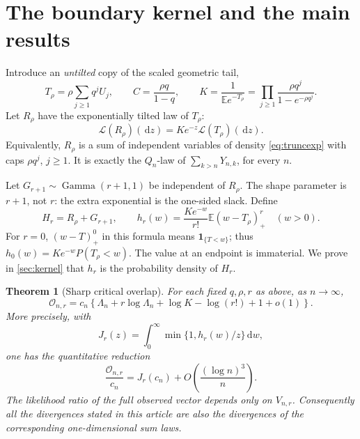 \documentclass[11pt,oneside]{article}
\numberwithin{equation}{section}
\theoremstyle{plain}
\newtheorem{theorem}{Theorem}[section]
\theoremstyle{definition}
\theoremstyle{remark}
\newcommand{\E}{\mathbb E}
\newcommand{\ind}{\mathbf 1}
\newcommand{\Law}{\mathcal L}
\newcommand{\OO}{\mathcal O}
\newcommand{\dd}{\,\mathrm d}
\newcommand{\Gam}{\operatorname{Gamma}}
\begin{document}
\section{The boundary kernel and the main results}
\label{sec:main}
Introduce an \emph{untilted} copy of the scaled geometric tail,
\begin{equation}\label{eq:T}
 T_\rho=\rho\sum_{j\ge1}q^jU_j,\qquad
 C=\frac{\rho q}{1-q},\qquad
 K=\frac1{\E e^{-T_\rho}}
   =\prod_{j\ge1}\frac{\rho q^j}{1-e^{-\rho q^j}}.
\end{equation}
Let $R_\rho$ have the exponentially tilted law of $T_\rho$:
\begin{equation}\label{eq:R}
 \Law(R_\rho)(\dd z)=K e^{-z}\Law(T_\rho)(\dd z).
\end{equation}
Equivalently, $R_\rho$ is a sum of independent variables of density
\eqref{eq:truncexp} with caps $\rho q^j$, $j\ge1$. It is exactly the
$Q_n$-law of $\sum_{k>n}Y_{n,k}$, for every $n$.

Let $G_{r+1}\sim\Gam(r+1,1)$ be independent of $R_\rho$. The
shape parameter is $r+1$, not $r$: the extra exponential is the
one-sided slack. Define
\begin{equation}\label{eq:Hr}
 H_r=R_\rho+G_{r+1},\qquad
 h_r(w)=\frac{K e^{-w}}{r!}\E (w-T_\rho)_+^r\quad(w>0).
\end{equation}
For $r=0$, $(w-T)_+^0$ in this formula means $\ind_{\{T<w\}}$;
thus $h_0(w)=K e^{-w}P(T_\rho<w)$. The value at an endpoint is immaterial.
We prove in \cref{sec:kernel} that $h_r$ is the probability density of
$H_r$.

\begin{theorem}[Sharp critical overlap]\label{thm:overlap}
For each fixed $q,\rho,r$ as above, as $n\to\infty$,
\begin{equation}\label{eq:mainoverlap}
 \OO_{n,r}=c_n\left\{
 \Lambda_n+r\log\Lambda_n+\log K-\log(r!)+1+o(1)\right\}.
\end{equation}
More precisely, with
\begin{equation}\label{eq:Jdef}
 J_r(z)=\int_0^\infty\min\{1,h_r(w)/z\}\dd w,
\end{equation}
one has the quantitative reduction
\begin{equation}\label{eq:quantJ}
 \frac{\OO_{n,r}}{c_n}=J_r(c_n)+O\!\left(\frac{(\log n)^3}{n}\right).
\end{equation}
The likelihood ratio of the full observed vector depends only on
$V_{n,r}$. Consequently all the divergences stated in this article are
also the divergences of the corresponding one-dimensional sum laws.
\end{theorem}
\end{document}
